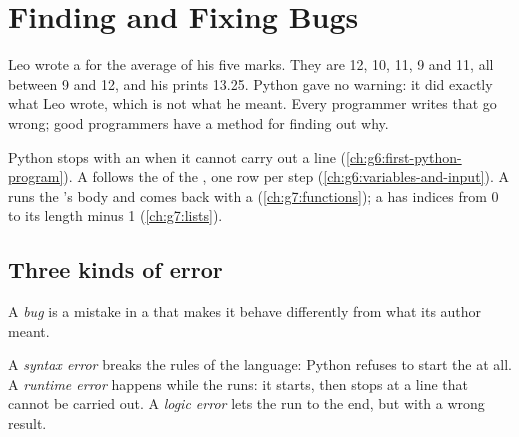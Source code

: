 \chapter{Finding and Fixing Bugs}\label{ch:g7:finding-and-fixing-bugs}

Leo wrote a  for the average of his five marks. They are 12, 10, 11,
9 and 11, all between 9 and 12, and his  prints 13.25. Python gave no
warning: it did exactly what Leo wrote, which is not what he meant. Every
programmer writes  that go wrong; good programmers have a method for
finding out why.

\begin{recall}
Python stops with an  when it cannot carry out a line
(\cref{ch:g6:first-python-program}). A  follows the  of the
, one row per step (\cref{ch:g6:variables-and-input}). A  runs the 's body and comes back with a 
(\cref{ch:g7:functions}); a  has indices from 0 to its length minus 1
(\cref{ch:g7:lists}).
\end{recall}

\section{Three kinds of error}

\begin{definition}[Bug]\label{def:g7:finding-and-fixing-bugs:bug}
A \emph{bug} is a mistake in a  that makes it behave
differently from what its author meant.
\end{definition}

\begin{definition}\label{def:g7:finding-and-fixing-bugs:kinds}
A \emph{syntax error} breaks the rules of the language:
Python refuses to start the  at all. A \emph{runtime
error} happens while the  runs: it starts, then
stops at a line that cannot be carried out. A \emph{logic error} lets the  run to the end, but with a wrong result.
\end{definition}

